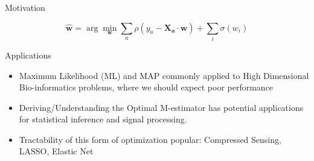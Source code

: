 \documentclass[pdf]{beamer}
\begin{document}
\begin{frame}{Motivation}

\begin{equation*}
            \mathbf{\hat{w}} = \arg\min_\mathbf{w} {\sum_a{\rho(y_a - \mathbf{X_a} \cdot\mathbf{ w})} + \sum_i{\sigma(w_i)}}
        \end{equation*}

\begin{block}{Applications}
\begin{itemize}
 \item{Maximum Likelihood (ML) and MAP commonly applied to High Dimensional Bio-informatics problems, where we should expect poor performance}
 \item{Deriving/Understanding the Optimal M-estimator has potential applications for statistical inference and signal processing.}
 \item{ Tractability of this form of optimization popular: Compressed Sensing, LASSO, Elastic Net}
\end{itemize}
\end{block}





\end{frame}
\end{document}

